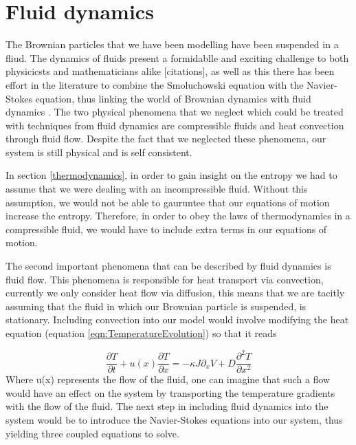 \section{Fluid dynamics} \label{fluidDynamics}
The Brownian particles that we have been modelling have been suspended in a fliud. The dynamics of fluids present a formidablle and exciting challenge to both physicicsts and mathematicians alike {\color{red} [citations]}, as well as this there has been effort in the literature to combine the Smoluchowski equation with the Navier-Stokes equation, thus linking the world of Brownian dynamics with fluid dynamics \cite{Constantin2007}. The two physical phenomena that we neglect which could be treated with techniques from fluid dynamics are compressible fluids and heat convection through fluid flow. Despite the fact that we neglected these phenomena, our system is still physical and is self consistent.

In section \ref{thermodynamics}, in order to gain insight on the entropy we had to assume that we were dealing with an incompressible fluid. Without this assumption, we would not be able to gauruntee that our equations of motion
increase the entropy. Therefore, in order to obey the laws of thermodynamics in a compressible fluid, we would have to include extra terms in our equations of motion.

The second important phenomena that can be described by fluid dynamics is fluid flow. This phenomena is responsible for heat transport via convection, currently we only consider heat flow via diffusion, this means that we are tacitly assuming that the fluid in which our Brownian particle is suspended, is stationary. Including convection into our model would involve modifying the heat equation (equation \ref{eqn:TemperatureEvolution}) so that it reads

\begin{equation}
\frac{\partial T}{\partial t} + u(x) \frac{\partial T}{\partial x} = -\kappa J \partial_x V + D \frac{\partial^2 T}{\partial x^2} 
\end{equation}
Where u(x) represents the flow of the fluid, one can imagine that such a flow would have an effect on the system by transporting the temperature gradients with the flow of the fluid. The next step in including fluid dynamics into the system would be to introduce the Navier-Stokes equations into our system, thus yielding three coupled equations to solve.

